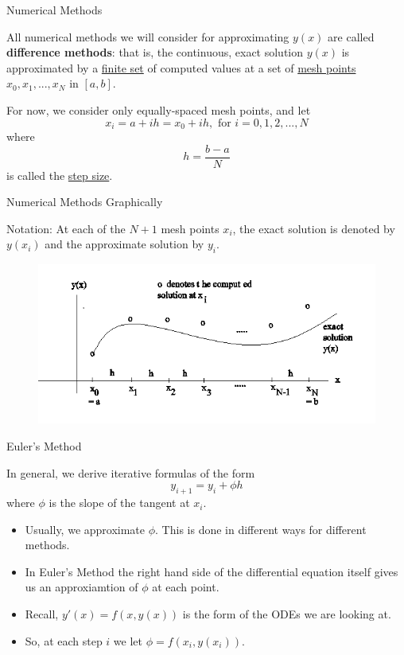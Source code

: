 \documentclass[12pt]{beamer}
\begin{document}
\begin{frame}{Numerical Methods}

All numerical methods we will consider for approximating $y(x)$ are called {\bf difference methods}:  that is, the continuous, exact solution $y(x)$ is approximated by a \underline{finite set} of computed values at a set of \underline{mesh points} $x_0,x_1,...,x_N$  in $[a,b]$.

For now, we consider only equally-spaced mesh points, and let
\[
x_i=a+ih=x_0+ih, \text{ for } i=0,1,2,...,N
\]
where
\[
h=\frac{b-a}{N}					 
\]
is called the \underline{step size}.

\end{frame}

\begin{frame}{Numerical Methods Graphically}

Notation: At each of the $N+1$ mesh points $x_i$, the exact solution is denoted by $y(x_i)$ and the approximate solution by $y_i$.

\begin{figure}[h] 
  \centering
  \includegraphics[scale=0.7]{solving_odes}
  \label{fig:solving_odes}
\end{figure}

\end{frame}

\begin{frame}{Euler's Method}

In general, we derive iterative formulas of the form
\[ y_{i+1}=y_i + \phi h \]
where $\phi$ is the slope of the tangent at $x_i$.
\begin{itemize}
\item{Usually, we approximate $\phi$. This is done in different ways for different methods.}
\item{In Euler's Method the right hand side of the differential equation itself gives us an approxiamtion of $\phi$ at each point.}
\item{Recall, $y'(x)=f(x,y(x))$ is the form of the ODEs we are looking at.}
\item{So, at each step $i$ we let $\phi = f(x_i,y(x_i))$.}
\end{itemize}

\end{frame}
\end{document}
